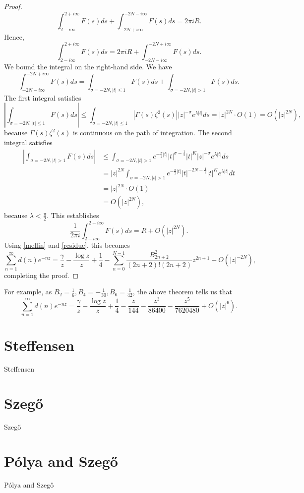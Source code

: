 \documentclass{amsart}
\begin{document}
\begin{proof}
\[
\int_{2-i\infty}^{2+i\infty} F(s) ds +\int_{-2N+i\infty}^{-2N-i\infty} F(s) ds
=2\pi i R.
\]
Hence,
\[
\int_{2-i\infty}^{2+i\infty} F(s) ds = 2\pi i R + \int_{-2N-i\infty}^{-2N+i\infty} F(s) ds.
\]
We bound the integral on the right-hand side. We have
\[
 \int_{-2N-i\infty}^{-2N+i\infty} F(s) ds = 
  \int_{\sigma=-2N, |t| \leq 1} F(s) ds+
    \int_{\sigma=-2N, |t| > 1} F(s)ds.
\]
The first integral satisfies
\[
\left|   \int_{\sigma=-2N, |t| \leq 1} F(s) ds \right|
\leq  \int_{\sigma=-2N, |t| \leq 1} |\Gamma(s) \zeta^2(s)|  |z|^{-\sigma} e^{\lambda |t|}
ds
= |z|^{2N} \cdot O(1) = O(|z|^{2N}),
\]
because $\Gamma(s) \zeta^2(s)$ is continuous on the path of integration.
The second integral satisfies
\begin{align*}
\left| \int_{\sigma=-2N, |t|>1} F(s) ds \right| &
\leq
 \int_{\sigma=-2N, |t|>1}
e^{-\frac{\pi}{2} |t|} |t|^{\sigma-\frac{1}{2}} |t|^K |z|^{-\sigma} e^{\lambda |t|}  ds\\
&=|z|^{2N}  \int_{\sigma=-2N, |t|>1} e^{-\frac{\pi}{2} |t|} |t|^{-2N-\frac{1}{2}} |t|^K  e^{\lambda |t|}  dt\\
&=|z|^{2N} \cdot O(1)\\
&=O(|z|^{2N}),
\end{align*}
because $\lambda<\frac{\pi}{2}$. This establishes
\[
\frac{1}{2\pi i} \int_{2-i\infty}^{2+i\infty} F(s) ds = R +O(|z|^{2N}).
\]
Using \eqref{mellin} and \eqref{residue}, this becomes
\[
\sum_{n=1}^\infty d(n) e^{-nz} = 
\frac{\gamma}{z}-\frac{\log z}{z}+\frac{1}{4} - \sum_{n=0}^{N-1}  \frac{B_{2n+2}^2}{(2n+2)!(2n+2)} z^{2n+1}
+O(|z|^{-2N}),
\]
completing the proof.
\end{proof}

For example,
as $B_2=\frac{1}{6},B_4=-\frac{1}{30},B_6=\frac{1}{42}$, the above theorem tells us that
\[
\sum_{n=1}^\infty d(n)e^{-nz} =  \frac{\gamma}{z}-\frac{\log z}{z}+\frac{1}{4}
-\frac{z}{144}
-\frac{z^3}{86400}
-\frac{z^5}{7620480}+
O(|z|^6).
\]


\section{Steffensen}
Steffensen \cite{steffensen}



\section{Szeg{\H o}}
Szeg{\H o} \cite{szego}


\section{P\'olya and Szeg{\H o}}
P\'olya and Szeg{\H o} \cite{polya}
\end{document}
